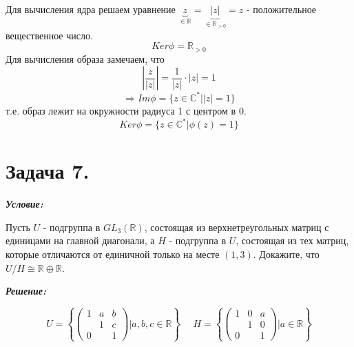 Для вычисления ядра решаем уравнение $\underbrace{z}_{\in \mathbb{R}} = \underbrace{|z|}_{\in \mathbb{R}_{>0}} = z$ - положительное вещественное число.
\[ Ker \phi = \mathbb{R}_{>0} \]
Для вычисления образа замечаем, что 
\[ \left| \frac{z}{|z|} \right| = \frac{1}{|z|} \cdot |z| = 1 \]
\[ \Rightarrow Im \phi = \{ z \in \mathbb{C}^* | |z| = 1 \} \]
т.е. образ лежит на окружности радиуса 1 с центром в 0.
\[ Ker \phi = \{ z \in \mathbb{C}^* | \phi(z) = 1 \} \]

\section*{Задача 7.}

\noindent\textbf{\textit{Условие:}}

Пусть $U$ - подгруппа в $GL_3(\mathbb{R})$, состоящая из верхнетреугольных матриц с единицами на главной диагонали, а $H$ - подгруппа в $U$, состоящая из тех матриц, которые отличаются от единичной только на месте $(1, 3)$. Докажите, что $U / H \cong \mathbb{R} \oplus \mathbb{R}$.

\noindent\textbf{\textit{Решение:}}

\begin{center}
	\qquad
\end{center}

\[
U = \left\{
\begin{pmatrix}
1 & a & b \\
  & 1 & c \\
0 &   & 1
\end{pmatrix}
\bigg| a, b, c \in \mathbb{R} \right\}
~~~~~~
H = \left\{
\begin{pmatrix}
1 & 0 & a \\
  & 1 & 0 \\
0 &   & 1
\end{pmatrix}
\bigg| a \in \mathbb{R} \right\}
\]


